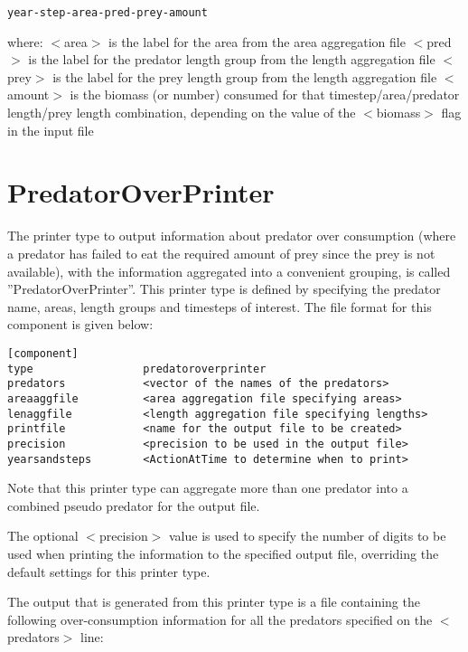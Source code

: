 \documentclass[10pt,twoside]{book}
\begin{document}
{\small\begin{verbatim}
year-step-area-pred-prey-amount
\end{verbatim}}

where:\newline
$<$area$>$ is the label for the area from the area aggregation file\newline
$<$pred$>$ is the label for the predator length group from the length aggregation file\newline
$<$prey$>$ is the label for the prey length group from the length aggregation file\newline
$<$amount$>$ is the biomass (or number) consumed for that timestep/area/predator length/prey length combination, depending on the value of the $<$biomass$>$ flag in the input file

\section{PredatorOverPrinter}\label{sec:predatoroverprinter}
The printer type to output information about predator over consumption (where a predator has failed to eat the required amount of prey since the prey is not available), with the information aggregated into a convenient grouping, is called ''PredatorOverPrinter''.  This printer type is defined by specifying the predator name, areas, length groups and timesteps of interest.  The file format for this component is given below:

{\small\begin{verbatim}
[component]
type                 predatoroverprinter
predators            <vector of the names of the predators>
areaaggfile          <area aggregation file specifying areas>
lenaggfile           <length aggregation file specifying lengths>
printfile            <name for the output file to be created>
precision            <precision to be used in the output file>
yearsandsteps        <ActionAtTime to determine when to print>
\end{verbatim}}

Note that this printer type can aggregate more than one predator into a combined pseudo predator for the output file.

\bigskip
The optional $<$precision$>$ value is used to specify the number of digits to be used when printing the information to the specified output file, overriding the default settings for this printer type.

\bigskip
The output that is generated from this printer type is a file containing the following over-consumption information for all the predators specified on the $<$predators$>$ line:
\end{document}
